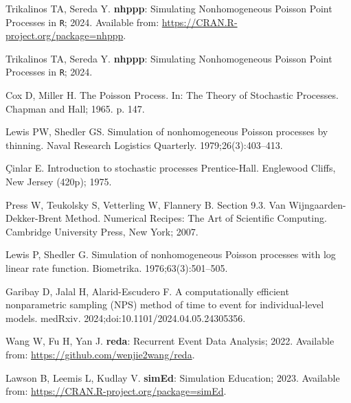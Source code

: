 \documentclass[10pt,letterpaper]{article}
\newcommand{\pkg}[1]{{\bf #1}}
\newcommand{\proglang}[1]{\texttt{#1}}
\begin{document}
%
%
% 
\begin{thebibliography}{10}

Trikalinos TA, Sereda Y. \pkg{nhppp}: Simulating Nonhomogeneous Poisson Point Processes in \proglang{R}; 2024.
\newblock Available from: \url{https://CRAN.R-project.org/package=nhppp}.

Trikalinos TA, Sereda Y. \pkg{nhppp}: Simulating Nonhomogeneous Poisson Point Processes in \proglang{R}; 2024.

Cox D, Miller H.
\newblock The {P}oisson Process.
\newblock In: The Theory of Stochastic Processes. Chapman and Hall; 1965. p. 147.

Lewis PW, Shedler GS.
\newblock Simulation of nonhomogeneous {P}oisson processes by thinning.
\newblock Naval Research Logistics Quarterly. 1979;26(3):403--413.

\c{C}inlar E.
\newblock Introduction to stochastic processes Prentice-Hall.
\newblock Englewood Cliffs, New Jersey (420p); 1975.

Press W, Teukolsky S, Vetterling W, Flannery B.
\newblock Section 9.3. Van Wijngaarden-Dekker-Brent Method. Numerical Recipes: The Art of Scientific Computing.
\newblock Cambridge University Press, New York; 2007.

Lewis P, Shedler G.
\newblock Simulation of nonhomogeneous Poisson processes with log linear rate function.
\newblock Biometrika. 1976;63(3):501--505.

Garibay D, Jalal H, Alarid-Escudero F.
\newblock A computationally efficient nonparametric sampling (NPS) method of time to event for individual-level models.
\newblock medRxiv. 2024;doi:{10.1101/2024.04.05.24305356}.

Wang W, Fu H, Yan J. \pkg{reda}: {R}ecurrent Event Data Analysis; 2022.
\newblock Available from: \url{https://github.com/wenjie2wang/reda}.

Lawson B, Leemis L, Kudlay V. \pkg{simEd}: {S}imulation Education; 2023.
\newblock Available from: \url{https://CRAN.R-project.org/package=simEd}.


\end{thebibliography}
\end{document}
